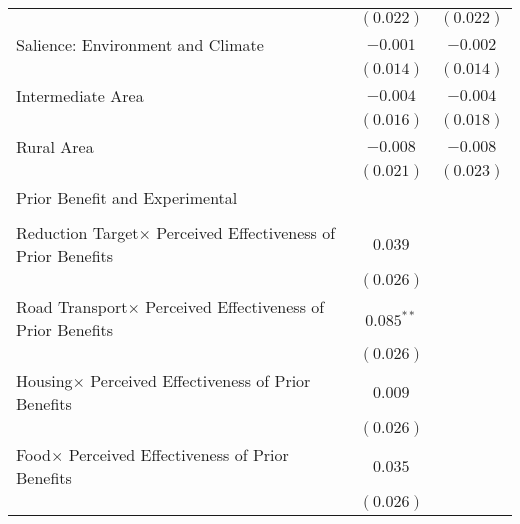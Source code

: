 \begin{center}
\begin{tiny}
\begin{longtable}{l@{} c@{} c@{}}
                                                                           & $(0.022)$        & $(0.022)$        \\
\quad Salience: Environment and Climate                                    & $-0.001$         & $-0.002$         \\
                                                                           & $(0.014)$        & $(0.014)$        \\
Intermediate Area                                                          & $-0.004$         & $-0.004$         \\
                                                                           & $(0.016)$        & $(0.018)$        \\
Rural Area                                                                 & $-0.008$         & $-0.008$         \\
                                                                           & $(0.021)$        & $(0.023)$        \\
Prior Benefit and Experimental                                             &                  &                  \\
                                                                           &                  &                  \\
\quad Reduction Target$\times$ Perceived Effectiveness of Prior Benefits   & $0.039$          &                  \\
                                                                           & $(0.026)$        &                  \\
\quad Road Transport$\times$ Perceived Effectiveness of Prior Benefits     & $0.085^{**}$     &                  \\
                                                                           & $(0.026)$        &                  \\
\quad Housing$\times$ Perceived Effectiveness of Prior Benefits            & $0.009$          &                  \\
                                                                           & $(0.026)$        &                  \\
\quad Food$\times$ Perceived Effectiveness of Prior Benefits               & $0.035$          &                  \\
                                                                           & $(0.026)$        &                  \\

\end{longtable}
\end{tiny}
\end{center}
